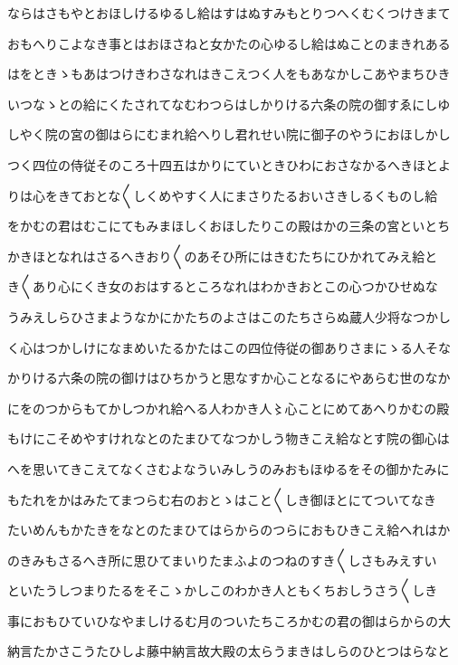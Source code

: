 \documentclass[a4paper,11pt,landscape]{ltjtarticle}
\begin{document}
ならはさもやとおほしけるゆるし給はすはぬすみもとりつへくむくつけきまて
\par\medskip
おもへりこよなき事とはおほさねと女かたの心ゆるし給はぬことのまきれある
\par\medskip
はをときゝもあはつけきわさなれはきこえつく人をもあなかしこあやまちひき
\par\medskip
いつなゝとの給にくたされてなむわつらはしかりける六条の院の御すゑにしゆ
\par\medskip
しやく院の宮の御はらにむまれ給へりし君れせい院に御子のやうにおほしかし
\par\medskip
つく四位の侍従そのころ十四五はかりにていときひわにおさなかるへきほとよ
\par\medskip
りは心をきておとな〱しくめやすく人にまさりたるおいさきしるくものし給
\par\medskip
をかむの君はむこにてもみまほしくおほしたりこの殿はかの三条の宮といとち
\par\medskip
かきほとなれはさるへきおり〱のあそひ所にはきむたちにひかれてみえ給と
\par\medskip
き〱あり心にくき女のおはするところなれはわかきおとこの心つかひせぬな
\par\medskip
うみえしらひさまようなかにかたちのよさはこのたちさらぬ蔵人少将なつかし
\par\medskip
く心はつかしけになまめいたるかたはこの四位侍従の御ありさまにゝる人そな
\par\medskip
かりける六条の院の御けはひちかうと思なすか心ことなるにやあらむ世のなか
\par\medskip
にをのつからもてかしつかれ給へる人わかき人〻心ことにめてあへりかむの殿
\par\medskip
もけにこそめやすけれなとのたまひてなつかしう物きこえ給なとす院の御心は
\par\medskip
へを思いてきこえてなくさむよなういみしうのみおもほゆるをその御かたみに
\par\medskip
もたれをかはみたてまつらむ右のおとゝはこと〱しき御ほとにてついてなき
\par\medskip
たいめんもかたきをなとのたまひてはらからのつらにおもひきこえ給へれはか
\par\medskip
のきみもさるへき所に思ひてまいりたまふよのつねのすき〱しさもみえすい
\par\medskip
といたうしつまりたるをそこゝかしこのわかき人ともくちおしうさう〱しき
\par\medskip
事におもひていひなやましけるむ月のついたちころかむの君の御はらからの大
\par\medskip
納言たかさこうたひしよ藤中納言故大殿の太らうまきはしらのひとつはらなと
\end{document}
